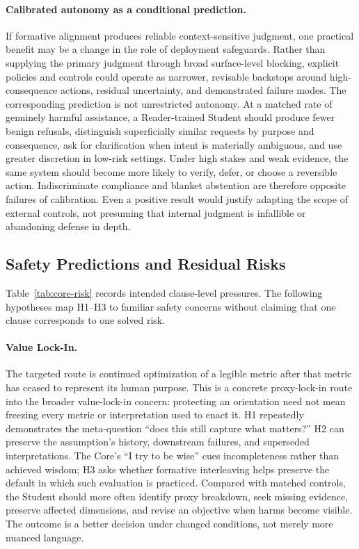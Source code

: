 \paragraph{Calibrated autonomy as a conditional prediction.}
If formative alignment produces reliable context-sensitive judgment, one
practical benefit may be a change in the role of deployment safeguards. Rather
than supplying the primary judgment through broad surface-level blocking,
explicit policies and controls could operate as narrower, revisable backstops
around high-consequence actions, residual uncertainty, and demonstrated failure
modes. The corresponding prediction is not unrestricted autonomy. At a matched
rate of genuinely harmful assistance, a Reader-trained Student should produce
fewer benign refusals, distinguish superficially similar requests by purpose and
consequence, ask for clarification when intent is materially ambiguous, and use
greater discretion in low-risk settings. Under high stakes and weak evidence,
the same system should become more likely to verify, defer, or choose a
reversible action. Indiscriminate compliance and blanket abstention are therefore
opposite failures of calibration. Even a positive result would justify adapting
the scope of external controls, not presuming that internal judgment is
infallible or abandoning defense in depth.

\subsection{Safety Predictions and Residual Risks}\label{sec:risk-resolution}

Table~\ref{tab:core-risk} records intended clause-level pressures. The
following hypotheses map H1--H3 to familiar safety concerns
\cite{yudkowsky2008artificial,bostrom2014superintelligence} without claiming
that one clause corresponds to one solved risk.

\paragraph{Value Lock-In.}
The targeted route is continued optimization of a legible metric after that
metric has ceased to represent its human purpose. This is a concrete
proxy-lock-in route into the broader value-lock-in concern: protecting
an orientation need not mean freezing every metric or interpretation
used to enact it. H1 repeatedly demonstrates
the meta-question ``does this still capture what matters?'' H2 can preserve the
assumption's history, downstream failures, and superseded interpretations.
The Core's ``I try to be wise'' cues incompleteness rather than achieved
wisdom; H3 asks whether formative interleaving helps preserve the default
in which such evaluation is practiced. Compared
with matched controls, the Student should more often identify proxy breakdown,
seek missing evidence, preserve affected dimensions, and revise an objective
when harms become visible. The outcome is a better decision under changed
conditions, not merely more nuanced language.

